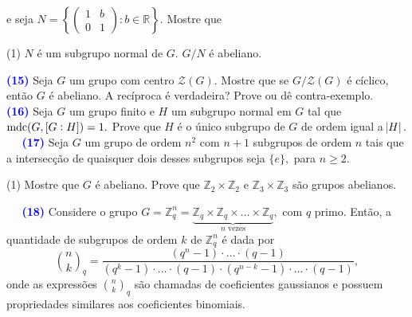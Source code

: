 \documentclass[12pt, a4paper]{article}
\newcommand{\mdc}{{\rm mdc}}
\newcommand{\negrito}[1]{\mbox{\boldmath{$#1$}}}
\begin{document}
e seja $N = \left\{ \left(\begin{array}{cc} 1 & b \\ 0 & 1 \end{array}\right) : b \in \mathbb{R} \right\}.$ Mostre que
\begin{tasks}[counter-format={(tsk[a])},label-width=3.6ex, label-format = {\bfseries}, column-sep = {0pt}](1)
\task[\textcolor{Floresta}{$\negrito{(a)} $}] $N$ é um subgrupo normal de $G.$
\task[\textcolor{Floresta}{$\negrito{(b)} $}] $G/N$ é abeliano.
\end{tasks}
\textcolor{blue}{\bf(15)}\label{53} Seja $G$ um grupo com centro $\mathcal{Z}(G).$ Mostre que se $G/\mathcal{Z}(G)$ é cíclico, então $G$ é abeliano. A recíproca é verdadeira? Prove ou dê contra-exemplo.
\textcolor{white}{Oi}\newline\newline
\textcolor{blue}{\bf(16)}\label{54} Seja $G$ um grupo finito e $H$ um subgrupo normal em $G$ tal que $\mdc(G, [G:H]) = 1.$ Prove que $H$ é o único subgrupo de $G$ de ordem igual a $\abs{H}.$ 
\textcolor{white}{Oi}\newline\newline
\textcolor{blue}{\bf(17)}\label{55} Seja $G$ um grupo de ordem $n^2$ com $n+1$ subgrupos de ordem $n$ tais que a intersecção de quaisquer dois desses subgrupos seja $\{e \},$ para $n \ge 2.$ 
\begin{tasks}[counter-format={(tsk[a])},label-width=3.6ex, label-format = {\bfseries}, column-sep = {0pt}](1)
\task[\textcolor{Floresta}{$\negrito{(a)} $}] Mostre que $G$ é abeliano.
\task[\textcolor{Floresta}{$\negrito{(b)} $}] Prove que $\mathbb{Z}_2 \times \mathbb{Z}_2$ e $\mathbb{Z}_3 \times \mathbb{Z}_3$ são grupos abelianos.
\end{tasks}
\textcolor{white}{Oi}\newline\newline
\textcolor{blue}{\bf(18)}\label{56} Considere o grupo $G = \mathbb{Z}_q^n = \underbrace{\mathbb{Z}_q \times \mathbb{Z}_q \times \ldots \times \mathbb{Z}_q}_{n \mbox{ vezes}},$ com $q$ primo. Então, a quantidade de subgrupos de ordem $k$ de $\mathbb{Z}_q^n$ é dada por
\[
\binom{n}{k}_q = \frac{(q^n - 1) \cdot \ldots \cdot (q - 1)}{(q^k - 1) \cdot \ldots \cdot (q - 1) \cdot (q^{n-k}-1) \cdot \ldots \cdot (q - 1)},
\]
onde as expressões $\binom{n}{k}_q$ são chamadas de coeficientes gaussianos e possuem propriedades similares aos coeficientes binomiais. 
\end{document}
